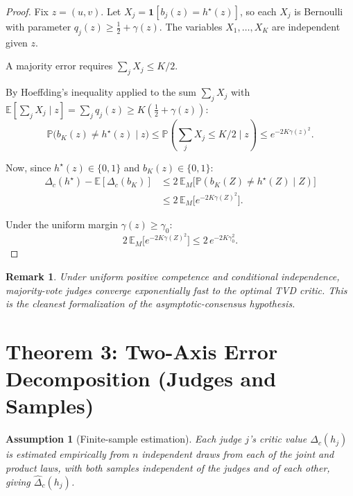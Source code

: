 \documentclass[11pt]{article}
\newtheorem{assumption}[theorem]{Assumption}
\newtheorem{remark}[theorem]{Remark}
\newcommand{\E}{\mathbb{E}}
\newcommand{\Prob}{\mathbb{P}}
\begin{document}
\begin{proof}
Fix $z = (u,v)$. Let $X_j = \mathbf{1}[b_j(z) = h^\star(z)]$, so each
$X_j$ is Bernoulli with parameter $q_j(z) \ge \frac{1}{2} + \gamma(z)$.
The variables $X_1, \ldots, X_K$ are independent given $z$.

A majority error requires $\sum_j X_j\le K/2$.

By Hoeffding's inequality applied to the sum $\sum_j X_j$ with
$\E[\sum_j X_j \mid z] = \sum_j q_j(z) \ge K(\frac{1}{2} + \gamma(z))$:
\begin{equation}
\Prob\!\big(b_K(z) \neq h^\star(z) \mid z\big)
\le \Prob\!\left(\sum_j X_j \le K/2 \mid z\right)
\le e^{-2K\gamma(z)^2}.
\end{equation}

Now, since $h^\star(z) \in \{0,1\}$ and $b_K(z) \in \{0,1\}$:
\begin{align}
\Delta_c(h^\star)-\E[\Delta_c(b_K)]
&\le 2\,\E_M\!\big[\Prob(b_K(Z)\ne h^\star(Z)\mid Z)\big] \\
&\le 2 \, \E_M\!\big[e^{-2K\gamma(Z)^2}\big].
\end{align}

Under the uniform margin $\gamma(z) \ge \gamma_0$:
\begin{equation}
2 \, \E_M\!\big[e^{-2K\gamma(Z)^2}\big]
\le 2 \, e^{-2K\gamma_0^2}.
\end{equation}
\end{proof}

\begin{remark}
Under uniform positive competence and conditional independence, majority-vote judges converge
\emph{exponentially fast} to the optimal TVD critic. This is the cleanest
formalization of the asymptotic-consensus hypothesis.
\end{remark}

\section{Theorem 3: Two-Axis Error Decomposition (Judges and Samples)}
\label{sec:two-axis}

\begin{assumption}[Finite-sample estimation]
\label{asm:finite-sample}
Each judge $j$'s critic value $\Delta_c(h_j)$ is estimated empirically from
$n$ independent draws from each of the joint and product laws, with both samples independent of the judges and of each other, giving $\widehat\Delta_c(h_j)$.
\end{assumption}
\end{document}
